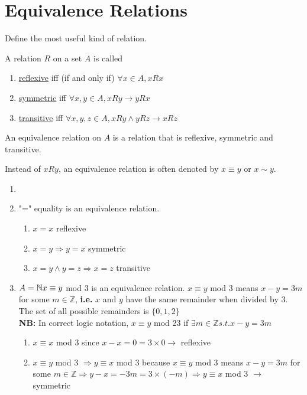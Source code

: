 \documentclass[10pt]{article}
\begin{document}
	\section{Equivalence Relations}
	\begin{description}
		\item[Task:] Define the most useful kind of relation.
		\item[Definition:] A relation $R$ on a set $A$ is called
		\begin{enumerate}
			\item \underline{reflexive} iff (if and only if) $\forall x \in A, xRx$
			\item \underline{symmetric} iff $\forall x, y \in A, xRy \rightarrow yRx$
			\item \underline{transitive} iff $\forall x, y, z \in A, xRy \land yRz \rightarrow xRz$
		\end{enumerate}
		\item An equivalence relation on $A$ is a relation that is reflexive, symmetric and transitive.
		\item[Notation:] Instead of $xRy$, an equivalence relation is often denoted by $x \equiv y$ or $x \sim y$.
		\item[Examples:]
		\begin{enumerate}
			\item[]
			\item "=" equality is an equivalence relation.
			\begin{enumerate}
				\item $x=x$ reflexive
				\item $x=y \Rightarrow y=x$ symmetric
				\item $x=y \land y=z \Rightarrow x=z$ transitive 
			\end{enumerate}
			\item $A = \mathbb{N} \\
			x \equiv y$ mod $3$ is an equivalence relation. $x \equiv y$ mod 3 means $x-y = 3m$ for some $m \in \mathbb{Z}$, \textbf{i.e.} $x$ and $y$ have the same remainder when divided by 3. The set of all possible remainders is $\{0, 1, 2\}$ \\
			\textbf{NB:} In correct logic notation, $x \equiv y$ mod 23 if $\exists m \in \mathbb{Z} s.t. x-y=3m$
			\begin{enumerate}
				\item $x \equiv x$ mod 3 since $x-x=0=3 \times 0 \rightarrow$ reflexive
				\item $x \equiv y$ mod 3 $\Rightarrow y \equiv x$ mod 3 because $x \equiv y$ mod 3 means $x-y=3m$ for some $m \in \mathbb{Z} \Rightarrow y-x=-3m=3 \times (-m) \Rightarrow y \equiv x$ mod 3 $\rightarrow$ symmetric

\end{enumerate}
\end{enumerate}
\end{description}
\end{document}
